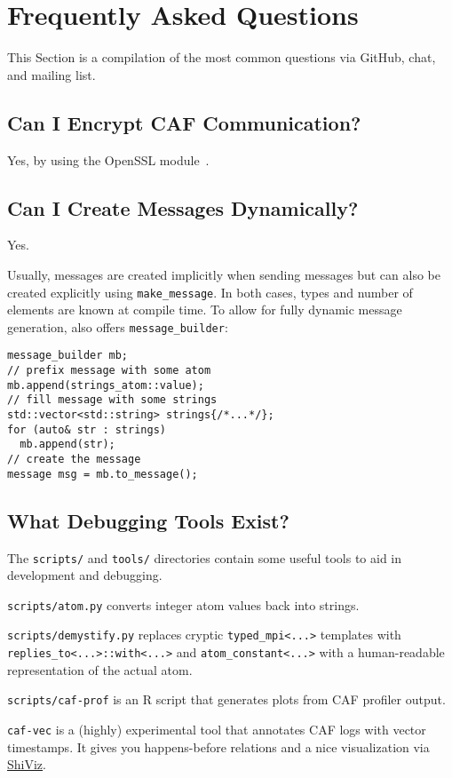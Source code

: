 \section{Frequently Asked Questions}
\label{faq}

This Section is a compilation of the most common questions via GitHub, chat,
and mailing list.

\subsection{Can I Encrypt CAF Communication?}

Yes, by using the OpenSSL module~.

\subsection{Can I Create Messages Dynamically?}

Yes.

Usually, messages are created implicitly when sending messages but can also be
created explicitly using \lstinline^make_message^. In both cases, types and
number of elements are known at compile time. To allow for fully dynamic
message generation, \lib also offers \lstinline^message_builder^:

\begin{lstlisting}
message_builder mb;
// prefix message with some atom
mb.append(strings_atom::value);
// fill message with some strings
std::vector<std::string> strings{/*...*/};
for (auto& str : strings)
  mb.append(str);
// create the message
message msg = mb.to_message();
\end{lstlisting}

\subsection{What Debugging Tools Exist?}

The \lstinline^scripts/^ and \lstinline^tools/^ directories contain some useful
tools to aid in development and debugging.

\lstinline^scripts/atom.py^ converts integer atom values back into strings.

\lstinline^scripts/demystify.py^ replaces cryptic \lstinline^typed_mpi<...>^
templates with \lstinline^replies_to<...>::with<...>^ and
\lstinline^atom_constant<...>^ with a human-readable representation of the
actual atom.

\lstinline^scripts/caf-prof^ is an R script that generates plots from CAF
profiler output.

\lstinline^caf-vec^ is a (highly) experimental tool that annotates CAF logs
with vector timestamps. It gives you happens-before relations and a nice
visualization via \href{https://bestchai.bitbucket.io/shiviz/}{ShiViz}.
